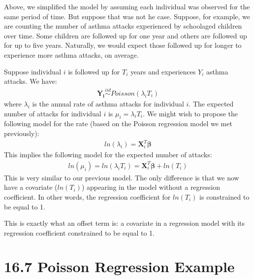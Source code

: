 \documentclass[letterpaper,10pt,english]{jupyterBook}
\begin{document}
\sphinxAtStartPar
Above, we simplified the model by assuming each individual was observed for the same period of time. But suppose that was not he case. Suppose, for example, we are counting the number of asthma attacks experienced by school\sphinxhyphen{}aged children over time. Some children are followed up for one year and others are followed up for up to five years. Naturally, we would expect those followed up for longer to experience more asthma attacks, on average.

\sphinxAtStartPar
Suppose individual \(i\) is followed up for \(T_i\) years and experiences \(Y_i\) asthma attacks. We have:
\begin{equation*}
\begin{split} 
\mathbf{Y_i} \overset{iid}{\sim} Poisson(\lambda_i T_i)
\end{split}
\end{equation*}
\sphinxAtStartPar
where \(\lambda_i\) is the annual rate of asthma attacks for individual \(i\). The expected number of attacks for individual \(i\) is \(\mu_i = \lambda_i T_i\). We might wish to propose the following model for the rate (based on the Poisson regression model we met previously):
\begin{equation*}
\begin{split}
ln(\lambda_i) = \mathbf{X}_i^T\mathbf{\beta}
\end{split}
\end{equation*}
\sphinxAtStartPar
This implies the following model for the expected number of attacks:
\begin{equation*}
\begin{split}
ln(\mu_i) = ln(\lambda_i T_i) =  \mathbf{X}_i^T\mathbf{\beta} + ln(T_i)
\end{split}
\end{equation*}
\sphinxAtStartPar
This is very similar to our previous model. The only difference is that we now have a covariate (\(ln(T_i)\)) appearing in the model without a regression coefficient. In other words, the regression coefficient for \(ln(T_i)\) is constrained to be equal to 1.

\sphinxAtStartPar
This is exactly what an offset term is: a covariate in a regression model with its regression coefficient constrained to be equal to 1.


\section{16.7 Poisson Regression Example}
\label{\detokenize{16.h. Generalised Linear Model (GLM):poisson-regression-example}}\label{\detokenize{16.h. Generalised Linear Model (GLM)::doc}}
\end{document}
